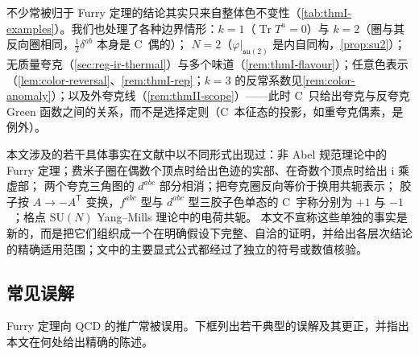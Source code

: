 \documentclass[UTF8,a4paper,11pt,fontset=fandol]{ctexart}
\theoremstyle{cplain}
\theoremstyle{cdefinition}
\theoremstyle{cremark}
\numberwithin{equation}{section}
\DeclareMathOperator{\Tr}{Tr}
\newcommand{\tp}{\mathsf{T}}                         %
\newcommand{\su}{\mathfrak{su}}
\newcommand{\ii}{\mathrm{i}}                        %
\begin{document}
不少常被归于 Furry 定理的结论其实只来自整体色不变性（\cref{tab:thmI-examples}）。我们也处理了各种边界情形：$k=1$（$\Tr T^a=0$）与 $k=2$（圈与其反向圈相同，$\frac12\delta^{ab}$ 本身是 C~偶的）；
$N=2$（$\varphi|_{\su(2)}$ 是内自同构，\cref{prop:su2}）；无质量夸克（\cref{sec:reg-ir-thermal}）与多个味道（\cref{rem:thmI-flavour}）；任意色表示（\cref{lem:color-reversal}、\cref{rem:thmI-rep}；$k=3$ 的反常系数见\cref{rem:color-anomaly}）；以及外夸克线（\cref{rem:thmII-scope}）——此时 C~只给出夸克与反夸克 Green 函数之间的关系，而不是选择定则（C~本征态的投影，如重夸克偶素，是例外）。

本文涉及的若干具体事实在文献中以不同形式出现过：非 Abel 规范理论中的 Furry 定理\cite{Smolyakov1982}；费米子圈在偶数个顶点时给出色迹的实部、在奇数个顶点时给出 $\ii$ 乘虚部\cite{PastonProkhvatilovFranke1999}；
两个夸克三角图的 $d^{abc}$ 部分相消\cite{BlumAlkoferHuberWindisch2015}；把夸克圈反向等价于换用共轭表示\cite{MooreGorda2023}；
胶子按 $A\to-A^{\tp}$ 变换，$f^{abc}$ 型与 $d^{abc}$ 型三胶子色单态的 C~宇称分别为 $+1$ 与 $-1$~\cite{Ewerz2003}；格点 $\mathrm{SU}(N)$ Yang--Mills 理论中的电荷共轭\cite{daVeigaOCarroll2026}。
本文不宣称这些单独的事实是新的，而是把它们组织成一个在明确假设下完整、自洽的证明，并给出各层次结论的精确适用范围；文中的主要显式公式都经过了独立的符号或数值核验。

\subsection{常见误解}\label{sec:intro-misconceptions}

Furry 定理向 QCD 的推广常被误用。下框列出若干典型的误解及其更正，并指出本文在何处给出精确的陈述。
\end{document}
